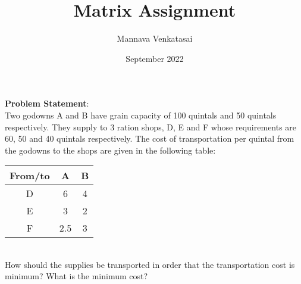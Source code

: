 \documentclass[journal,10pt,twocolumn]{article}
\title{\textbf{Matrix Assignment}}
\author{Mannava Venkatasai}
\date{September 2022}
\begin{document}
\maketitle
\raggedright \textbf{Problem Statement}: \vspace{3mm} \\
Two godowns A and B have grain capacity of 100 quintals and 50 quintals
respectively. They supply to 3 ration shops, D, E and F whose requirements are
60, 50 and 40 quintals respectively. The cost of transportation per quintal from
the godowns to the shops are given in the following table: \vspace{5mm} \\
\begin{tabular}{|c|c|c|}
\hline
 From/to & A& B  \\ 
 \hline
 D & 6 & 4 \\  
 \hline
 E & 3  & 2 \\
 \hline
  F & 2.5 & 3 \\
 \hline
\end{tabular} \\
\vspace{5mm}
How should the supplies be transported in order that the transportation cost is minimum? What is the minimum cost?
\end{document}
